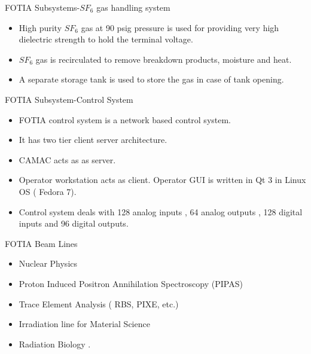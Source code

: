 \documentclass[11pt]{beamer}
\begin{document}
\begin{frame}{FOTIA Subsystems-$SF_{6}$ gas handling system}

  \begin{itemize}
      
    \item High purity $SF_{6}$ gas at 90 psig pressure is used for providing very high dielectric strength to hold the terminal voltage.
    \item $SF_{6}$ gas is recirculated to remove breakdown products, moisture and heat. 
    \item A separate storage tank is used to store the gas in case of tank opening.
    
    
           
   \end{itemize}

\end{frame}



\begin{frame}{FOTIA Subsystem-Control System}

  \begin{itemize}
      
    \item FOTIA control system is a network based control system.
    \item It has two tier client server architecture.
    \item CAMAC acts as as server.
    \item Operator workstation acts as client. Operator GUI is written in Qt 3 in Linux OS ( Fedora 7).
    \item Control system deals with 128 analog inputs , 64 analog outputs , 128 digital inputs and 96 digital outputs.
      
           
   \end{itemize}

\end{frame}


\begin{frame}{FOTIA Beam Lines}

  \begin{itemize}
      
    \item Nuclear Physics 
	\item Proton Induced Positron Annihilation Spectroscopy (PIPAS)
	\item Trace Element Analysis  ( RBS, PIXE, etc.)
	\item Irradiation line for Material Science 
	\item Radiation Biology .
     
      
           
   \end{itemize}

\end{frame}
\end{document}
